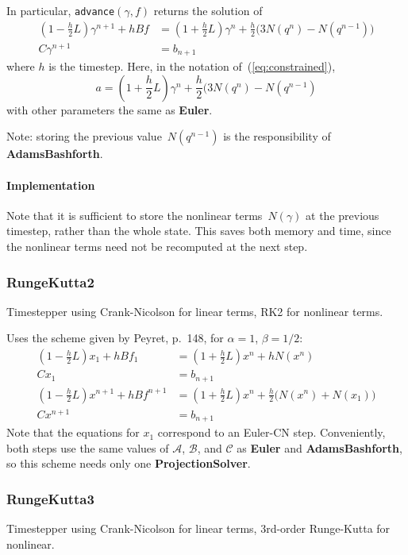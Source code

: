 \documentclass[11pt]{article}
\def\class#1{{\bf #1}} %
\def\fn#1{{\tt #1}} %
\begin{document}
In particular, \fn{advance}$(\gamma,f)$ returns the solution of
	\begin{align}
		(1-\frac{h}{2}L)\gamma^{n+1} + hBf &= (1 + \frac{h}{2}L)\gamma^n + \frac{h}{2} \big(3N(q^n) - N(q^{n-1})\big)\\
		C\gamma^{n+1} &= b_{n+1}
	\end{align}
where $h$ is the timestep.  Here, in the notation of~(\ref{eq:constrained}),
\begin{equation}
	a = (1+\frac{h}{2}L)\gamma^n + \frac{h}{2}(3N(q^n) - N(q^{n-1})
\end{equation}
with other parameters the same as \class{Euler}.

Note: storing the previous value~$N(q^{n-1})$ is the responsibility of \class{AdamsBashforth}.

\paragraph{Implementation}
Note that it is sufficient to store the nonlinear terms~$N(\gamma)$ at the previous timestep, rather than the whole state. This saves both memory and time, since the nonlinear terms need not be recomputed at the next step.

\subsubsection{RungeKutta2}
Timestepper using Crank-Nicolson for linear terms, RK2 for nonlinear terms.

Uses the scheme given by Peyret, p.~148\cite{Peyret}, for $\alpha=1$, $\beta=1/2$:
\begin{align}
	(1 - \frac{h}{2}L)x_1 + hBf_1 &= (1+\frac{h}{2}L)x^n + hN(x^n)\\
	Cx_1 &= b_{n+1}\\
	(1-\frac{h}{2}L)x^{n+1} + hBf^{n+1} &= (1 + \frac{h}{2}L)x^n + \frac{h}{2}\big(N(x^n) + N(x_1)\big)\\
	Cx^{n+1} &= b_{n+1}
\end{align}
Note that the equations for $x_1$ correspond to an Euler-CN step.  Conveniently, both steps use the same values of $\mathcal{A}$, $\mathcal{B}$, and $\mathcal{C}$ as \class{Euler} and \class{AdamsBashforth}, so this scheme needs only one \class{ProjectionSolver}.

\subsubsection{RungeKutta3}
Timestepper using Crank-Nicolson for linear terms, 3rd-order Runge-Kutta for nonlinear.
\end{document}
